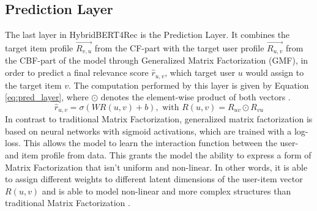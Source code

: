 \documentclass{Academic}
\begin{document}
        \subsection{Prediction Layer}
        The last layer in HybridBERT4Rec is the Prediction Layer. It combines the target item profile $\overrightarrow{R_{v,u}}$ from the CF-part with the target user profile $\overrightarrow{R_{u,v}}$ from the CBF-part of the model through Generalized Matrix Factorization (GMF), in order to predict a final relevance score $\hat{r}_{u,v}$, which target user $u$ would assign to the target item $v$. The computation performed by this layer is given by Equation \ref{eq:pred_layer}, where $\odot$ denotes the element-wise product of both vectors \cite{channarongHybridBERT4RecHybridContentBased2022}.
        \begin{equation}\label{eq:pred_layer}
            \hat{r}_{u,v} = \sigma(WR(u,v) + b), \text{ with }
            R(u,v) = R_{uv} \odot R_{vu}
        \end{equation}
        In contrast to traditional Matrix Factorization, generalized matrix factorization is based on neural networks with sigmoid activations, which are trained with a log-loss. This allows the model to learn the interaction function between the user- and item profile from data. This grants the model the ability to express a form of Matrix Factorization that isn't uniform and non-linear. In other words, it is able to assign different weights to different latent dimensions of the user-item vector $R(u,v)$ and is able to model non-linear and more complex structures than traditional Matrix Factorization \cite{heNeuralCollaborativeFiltering2017}.
\end{document}
